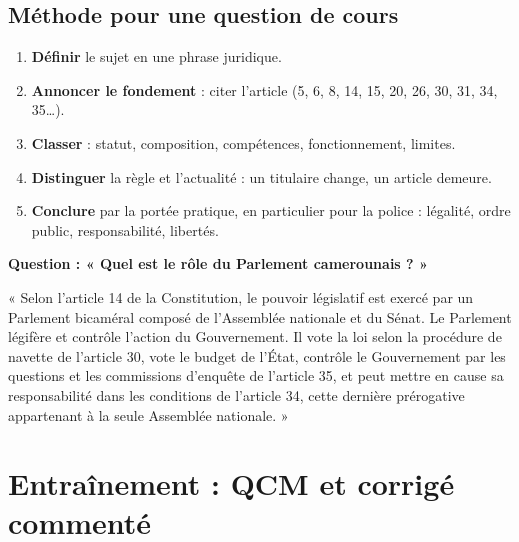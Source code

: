 \documentclass[11pt,a4paper,oneside]{report}
\begin{document}
\section{Méthode pour une question de cours}
\begin{enumerate}
  \item \textbf{Définir} le sujet en une phrase juridique.
  \item \textbf{Annoncer le fondement} : citer l'article (5, 6, 8, 14, 15, 20, 26, 30, 31, 34, 35…).
  \item \textbf{Classer} : statut, composition, compétences, fonctionnement, limites.
  \item \textbf{Distinguer} la règle et l'actualité : un titulaire change, un article demeure.
  \item \textbf{Conclure} par la portée pratique, en particulier pour la police : légalité, ordre public, responsabilité, libertés.
\end{enumerate}
\begin{methodbox}[title={Méthode concours — Modèle de réponse courte}]
\textbf{Question : « Quel est le rôle du Parlement camerounais ? »}

« Selon l'article 14 de la Constitution, le pouvoir législatif est exercé par un Parlement bicaméral composé de l'Assemblée nationale et du Sénat. Le Parlement légifère et contrôle l'action du Gouvernement. Il vote la loi selon la procédure de navette de l'article 30, vote le budget de l'État, contrôle le Gouvernement par les questions et les commissions d'enquête de l'article 35, et peut mettre en cause sa responsabilité dans les conditions de l'article 34, cette dernière prérogative appartenant à la seule Assemblée nationale. »
\end{methodbox}
\chapter{Entraînement : QCM et corrigé commenté}
\end{document}
